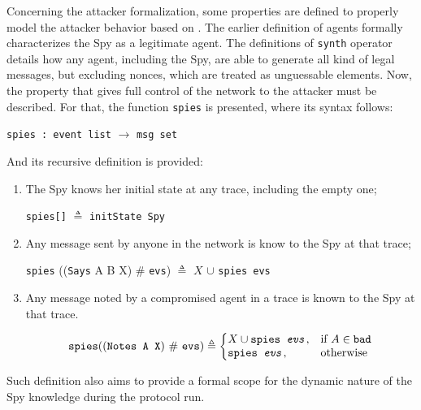 Concerning the attacker formalization, some properties are defined to properly model the attacker behavior based on \cite{dolev-yao}. The earlier definition of agents formally characterizes the Spy as a legitimate agent. The definitions of \texttt{synth} operator details how any agent, including the Spy, are able to generate all kind of legal messages, but excluding nonces, which are treated as unguessable elements. Now, the property that gives full control of the network to the attacker must be described. For that, the function \texttt{spies} is presented, where its syntax follows:

\begin{center}
  \texttt{spies : event list} $\longrightarrow$ \texttt{msg set}
\end{center}

And its recursive definition is provided:

\begin{enumerate}
  \item The Spy knows her initial state at any trace, including the empty one;
  \begin{center}
    \texttt{spies[]} $\triangleq$ \texttt{initState Spy}
  \end{center}

  \item Any message sent by anyone in the network is know to the Spy at that trace;
  \begin{center}
    \texttt{spies} ((\texttt{Says} A B X) \# \texttt{evs}) $\triangleq$ {$X$} $\cup$ \texttt{spies evs}
  \end{center}

  \item Any message noted by a compromised agent in a trace is known to the Spy at that trace.
  \begin{center}
    $$
      \texttt{spies} ((\texttt{Notes A X}) \text{ \# } \texttt{evs}) \triangleq \left\{
        \begin{array}{@{}ll@{}}
          {X} \cup \texttt{spies \textit{evs}}, &  \text{if } A \in \texttt{bad} \\
          \texttt{spies \textit{evs}}, & \text{otherwise}
        \end{array} \right.
    $$
  \end{center}
\end{enumerate}

Such definition also aims to provide a formal scope for the dynamic nature of the Spy knowledge during the protocol run.

